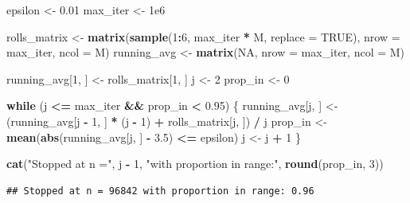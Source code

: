 \documentclass[
]{article}
\newenvironment{Shaded}{\begin{snugshade}}{\end{snugshade}}
\newcommand{\AttributeTok}[1]{\textcolor[rgb]{0.13,0.29,0.53}{#1}}
\newcommand{\ConstantTok}[1]{\textcolor[rgb]{0.56,0.35,0.01}{#1}}
\newcommand{\ControlFlowTok}[1]{\textcolor[rgb]{0.13,0.29,0.53}{\textbf{#1}}}
\newcommand{\DecValTok}[1]{\textcolor[rgb]{0.00,0.00,0.81}{#1}}
\newcommand{\FloatTok}[1]{\textcolor[rgb]{0.00,0.00,0.81}{#1}}
\newcommand{\FunctionTok}[1]{\textcolor[rgb]{0.13,0.29,0.53}{\textbf{#1}}}
\newcommand{\NormalTok}[1]{#1}
\newcommand{\OtherTok}[1]{\textcolor[rgb]{0.56,0.35,0.01}{#1}}
\newcommand{\SpecialCharTok}[1]{\textcolor[rgb]{0.81,0.36,0.00}{\textbf{#1}}}
\newcommand{\StringTok}[1]{\textcolor[rgb]{0.31,0.60,0.02}{#1}}
\begin{document}
\begin{Shaded}
\begin{Highlighting}[]
\NormalTok{epsilon }\OtherTok{\textless{}{-}} \FloatTok{0.01}
\NormalTok{max\_iter }\OtherTok{\textless{}{-}} \FloatTok{1e6}

\NormalTok{rolls\_matrix }\OtherTok{\textless{}{-}} \FunctionTok{matrix}\NormalTok{(}\FunctionTok{sample}\NormalTok{(}\DecValTok{1}\SpecialCharTok{:}\DecValTok{6}\NormalTok{, max\_iter }\SpecialCharTok{*}\NormalTok{ M, }\AttributeTok{replace =} \ConstantTok{TRUE}\NormalTok{), }\AttributeTok{nrow =}\NormalTok{ max\_iter, }\AttributeTok{ncol =}\NormalTok{ M)}
\NormalTok{running\_avg }\OtherTok{\textless{}{-}} \FunctionTok{matrix}\NormalTok{(}\ConstantTok{NA}\NormalTok{, }\AttributeTok{nrow =}\NormalTok{ max\_iter, }\AttributeTok{ncol =}\NormalTok{ M)}

\NormalTok{running\_avg[}\DecValTok{1}\NormalTok{, ] }\OtherTok{\textless{}{-}}\NormalTok{ rolls\_matrix[}\DecValTok{1}\NormalTok{, ]}
\NormalTok{j }\OtherTok{\textless{}{-}} \DecValTok{2}
\NormalTok{prop\_in }\OtherTok{\textless{}{-}} \DecValTok{0}

\ControlFlowTok{while}\NormalTok{ (j }\SpecialCharTok{\textless{}=}\NormalTok{ max\_iter }\SpecialCharTok{\&\&}\NormalTok{ prop\_in }\SpecialCharTok{\textless{}} \FloatTok{0.95}\NormalTok{) \{}
\NormalTok{  running\_avg[j, ] }\OtherTok{\textless{}{-}}\NormalTok{ (running\_avg[j }\SpecialCharTok{{-}} \DecValTok{1}\NormalTok{, ] }\SpecialCharTok{*}\NormalTok{ (j }\SpecialCharTok{{-}} \DecValTok{1}\NormalTok{) }\SpecialCharTok{+}\NormalTok{ rolls\_matrix[j, ]) }\SpecialCharTok{/}\NormalTok{ j}
\NormalTok{  prop\_in }\OtherTok{\textless{}{-}} \FunctionTok{mean}\NormalTok{(}\FunctionTok{abs}\NormalTok{(running\_avg[j, ] }\SpecialCharTok{{-}} \FloatTok{3.5}\NormalTok{) }\SpecialCharTok{\textless{}=}\NormalTok{ epsilon)}
\NormalTok{  j }\OtherTok{\textless{}{-}}\NormalTok{ j }\SpecialCharTok{+} \DecValTok{1}
\NormalTok{\}}

\FunctionTok{cat}\NormalTok{(}\StringTok{"Stopped at n ="}\NormalTok{, j }\SpecialCharTok{{-}} \DecValTok{1}\NormalTok{, }\StringTok{"with proportion in range:"}\NormalTok{, }\FunctionTok{round}\NormalTok{(prop\_in, }\DecValTok{3}\NormalTok{))}
\end{Highlighting}
\end{Shaded}

\begin{verbatim}
## Stopped at n = 96842 with proportion in range: 0.96
\end{verbatim}
\end{document}

